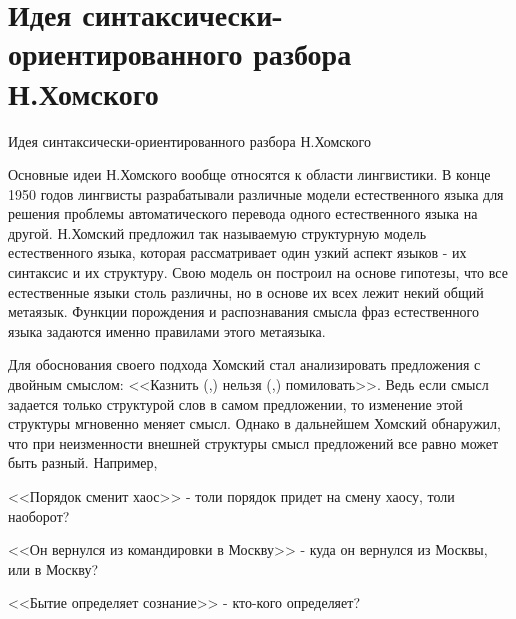 \documentclass[12pt, pdf, hyperref={unicode},handout]{beamer}
\begin{document}
\section{Идея синтаксически-ориентированного разбора Н.Хомского}
\begin{frame}{Идея синтаксически-ориентированного разбора Н.Хомского}
  \begin{block}

    \small{
      Основные идеи Н.Хомского вообще относятся к области лингвистики. В конце 1950 годов лингвисты разрабатывали различные модели естественного языка для решения проблемы автоматического перевода одного естественного языка на другой. Н.Хомский предложил так называемую структурную модель естественного языка, которая рассматривает один узкий аспект языков - их синтаксис и их структуру. Свою модель он построил на основе гипотезы, что все естественные языки столь различны, но в основе их всех лежит некий общий метаязык. Функции порождения и распознавания смысла фраз естественного языка задаются именно правилами этого метаязыка.

      Для обоснования своего подхода Хомский стал анализировать предложения с двойным смыслом: <<Казнить (,) нельзя (,) помиловать>>. Ведь если смысл задается только структурой слов в самом предложении, то изменение этой структуры мгновенно меняет смысл. Однако в дальнейшем Хомский обнаружил, что при неизменности внешней структуры смысл предложений все равно может быть разный. Например,

      <<Порядок сменит хаос>> - толи порядок придет на смену хаосу, толи наоборот?

      <<Он вернулся из командировки в Москву>> - куда он вернулся из Москвы, или в Москву?

      <<Бытие определяет сознание>> - кто-кого определяет?
      }

  \end{block}
  
\end{frame}
\end{document}

